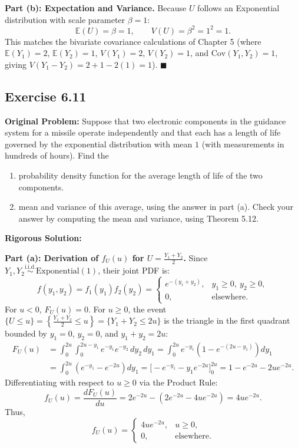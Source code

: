 \documentclass[11pt, letterpaper]{article}
\theoremstyle{definition}
\theoremstyle{remark}
\newcommand{\E}{\mathbb{E}}
\begin{document}
\textbf{Part (b): Expectation and Variance.}
Because $U$ follows an Exponential distribution with scale parameter $\beta = 1$:
\[
    \E(U) = \beta = 1, \qquad V(U) = \beta^2 = 1^2 = 1.
\]
This matches the bivariate covariance calculations of Chapter 5 (where $\E(Y_1) = 2$, $\E(Y_2) = 1$, $V(Y_1) = 2$, $V(Y_2) = 1$, and $\text{Cov}(Y_1, Y_2) = 1$, giving $V(Y_1 - Y_2) = 2 + 1 - 2(1) = 1$). \hfill $\blacksquare$

\subsection{Exercise 6.11}

\textbf{Original Problem:}
Suppose that two electronic components in the guidance system for a missile operate independently and that each has a length of life governed by the exponential distribution with mean $1$ (with measurements in hundreds of hours). Find the
\begin{enumerate}[label=\textbf{\alph*}]
    \item probability density function for the average length of life of the two components.
    \item mean and variance of this average, using the answer in part (a). Check your answer by computing the mean and variance, using Theorem 5.12.
\end{enumerate}

\hrulefill

\textbf{Rigorous Solution:}

\textbf{Part (a): Derivation of $f_U(u)$ for $U = \frac{Y_1 + Y_2}{2}$.}
Since $Y_1, Y_2 \stackrel{\text{i.i.d.}}{\sim} \text{Exponential}(1)$, their joint PDF is:
\[
    f(y_1, y_2) = f_1(y_1)f_2(y_2) = \begin{cases} e^{-(y_1 + y_2)}, & y_1 \ge 0, \ y_2 \ge 0, \\ 0, & \text{elsewhere.} \end{cases}
\]
For $u < 0$, $F_U(u) = 0$. For $u \ge 0$, the event $\{U \le u\} = \left\{\frac{Y_1 + Y_2}{2} \le u\right\} = \{Y_1 + Y_2 \le 2u\}$ is the triangle in the first quadrant bounded by $y_1 = 0$, $y_2 = 0$, and $y_1 + y_2 = 2u$:
\begin{align*}
    F_U(u) &= \int_{0}^{2u} \int_{0}^{2u - y_1} e^{-y_1} e^{-y_2}\,dy_2\,dy_1 = \int_{0}^{2u} e^{-y_1} \left(1 - e^{-(2u - y_1)}\right) dy_1 \\
    &= \int_{0}^{2u} \left(e^{-y_1} - e^{-2u}\right) dy_1 = \Big[ -e^{-y_1} - y_1 e^{-2u} \Big]_{0}^{2u} = 1 - e^{-2u} - 2u e^{-2u}.
\end{align*}
Differentiating with respect to $u \ge 0$ via the Product Rule:
\[
    f_U(u) = \frac{dF_U(u)}{du} = 2e^{-2u} - \left(2e^{-2u} - 4u e^{-2u}\right) = 4u e^{-2u}.
\]
Thus,
\[
    f_U(u) = \begin{cases} 4u e^{-2u}, & u \ge 0, \\ 0, & \text{elsewhere.} \end{cases}
\]
\end{document}
